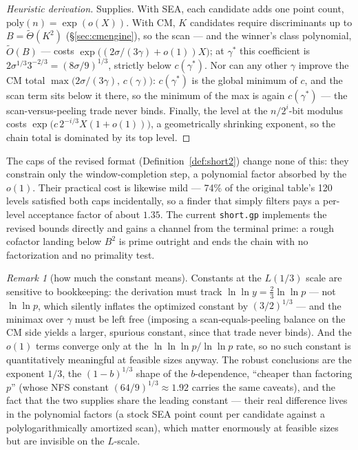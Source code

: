\documentclass[11pt]{amsart}
\newcommand{\Ot}{\widetilde{O}}
\theoremstyle{plain}
\theoremstyle{definition}
\theoremstyle{remark}
\newtheorem{remark}[theorem]{Remark}
\begin{document}
\begin{proof}[Heuristic derivation]
Supplies.  With SEA, each candidate adds one point count, $\mathrm{poly}(n) = \exp(o(X))$.  With CM,
$K$ candidates require discriminants up to $B = \widetilde\Theta(K^2)$ (\S\ref{sec:cmengine}), so the
scan --- and the winner's class polynomial, $\Ot(B)$ --- costs
$\exp\bigl((2\sigma/(3\gamma)+o(1))X\bigr)$; at $\gamma^*$ this coefficient is
$2\sigma^{1/3}3^{-2/3} = (8\sigma/9)^{1/3}$, strictly below $c(\gamma^*)$.  Nor can any other
$\gamma$ improve the CM total $\max\bigl(2\sigma/(3\gamma),\, c(\gamma)\bigr)$: $c(\gamma^*)$ is the
global minimum of $c$, and the scan term sits below it there, so the minimum of the max is again
$c(\gamma^*)$ --- the scan-versus-peeling trade never binds.  Finally, the level at the
$n/2^i$-bit modulus costs $\exp\bigl(c\,2^{-i/3}X(1+o(1))\bigr)$, a geometrically shrinking exponent,
so the chain total is dominated by its top level.
\end{proof}

The caps of the revised format (Definition~\ref{def:short2}) change none of this: they constrain
only the window-completion step, a polynomial factor absorbed by the $o(1)$.  Their practical cost
is likewise mild --- 74\% of the original table's 120 levels satisfied both caps incidentally, so a
finder that simply filters pays a per-level acceptance factor of about $1.35$.  The current
\texttt{short.gp} implements the revised bounds directly and gains a channel from the terminal
prime: a rough cofactor landing below $B^2$ is prime outright and ends the chain with no
factorization and no primality test.

\begin{remark}[how much the constant means]
\label{rem:constants}
Constants at the $L(1/3)$ scale are sensitive to bookkeeping: the derivation must track
$\ln\ln y = \tfrac23\ln\ln p$ --- not $\ln\ln p$, which silently inflates the optimized constant by
$(3/2)^{1/3}$ --- and the minimax over $\gamma$ must be left free (imposing a scan-equals-peeling
balance on the CM side yields a larger, spurious constant, since that trade never binds).  And the
$o(1)$ terms converge only at the $\ln\ln\ln p/\ln\ln p$ rate, so no such constant is quantitatively
meaningful at feasible sizes anyway.  The robust conclusions are the exponent $1/3$, the
$(1-b)^{1/3}$ shape of the $b$-dependence, ``cheaper than factoring $p$'' (whose NFS constant
$(64/9)^{1/3} \approx 1.92$ carries the same caveats), and the fact that the two supplies share the
leading constant --- their real difference lives in the polynomial factors (a stock SEA point count
per candidate against a polylogarithmically amortized scan), which matter enormously at feasible
sizes but are invisible on the $L$-scale.
\end{remark}
\end{document}
